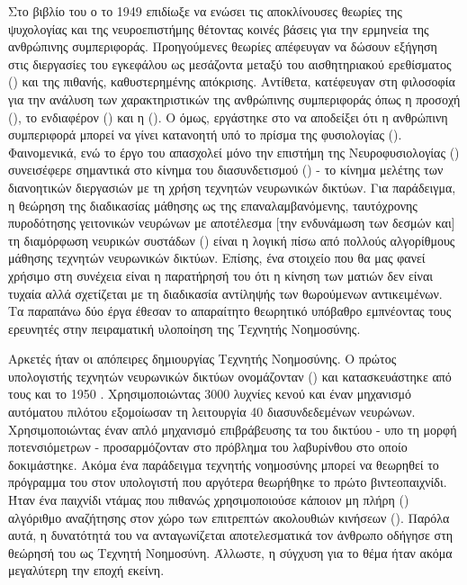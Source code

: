 Στο βιβλίο του \cite{hebb1949organization} ο  το 1949 επιδίωξε να ενώσει τις αποκλίνουσες θεωρίες της ψυχολογίας και της νευροεπιστήμης θέτοντας κοινές βάσεις για την ερμηνεία της ανθρώπινης συμπεριφοράς. Προηγούμενες θεωρίες απέφευγαν να δώσουν εξήγηση στις διεργασίες του εγκεφάλου ως μεσάζοντα μεταξύ του αισθητηριακού ερεθίσματος () και της πιθανής, καθυστερημένης απόκρισης. Αντίθετα, κατέφευγαν στη φιλοσοφία για την ανάλυση των χαρακτηριστικών της ανθρώπινης συμπεριφοράς όπως η προσοχή (), το ενδιαφέρον () και η  (). Ο  όμως, εργάστηκε στο να αποδείξει ότι η ανθρώπινη συμπεριφορά μπορεί να γίνει κατανοητή υπό το πρίσμα της φυσιολογίας (). Φαινομενικά, ενώ το έργο του απασχολεί μόνο την επιστήμη της Νευροφυσιολογίας () συνεισέφερε σημαντικά στο κίνημα του διασυνδετισμού () - το κίνημα μελέτης των διανοητικών διεργασιών με τη χρήση τεχνητών νευρωνικών δικτύων. Για παράδειγμα, η θεώρηση της διαδικασίας μάθησης ως της επαναλαμβανόμενης, ταυτόχρονης πυροδότησης γειτονικών νευρώνων με αποτέλεσμα [την ενδυνάμωση των δεσμών και] τη διαμόρφωση νευρικών συστάδων () είναι η λογική πίσω από πολλούς αλγορίθμους μάθησης τεχνητών νευρωνικών δικτύων. Επίσης, ένα στοιχείο που θα μας φανεί χρήσιμο στη συνέχεια είναι η παρατήρησή του ότι η κίνηση των ματιών δεν είναι τυχαία αλλά σχετίζεται με τη διαδικασία αντίληψής των θωρούμενων αντικειμένων. Τα παραπάνω δύο έργα έθεσαν το απαραίτητο θεωρητικό υπόβαθρο εμπνέοντας τους ερευνητές στην πειραματική υλοποίηση της Τεχνητής Νοημοσύνης.
\par

Αρκετές ήταν οι απόπειρες δημιουργίας Τεχνητής Νοημοσύνης. Ο πρώτος υπολογιστής τεχνητών νευρωνικών δικτύων ονομάζονταν  () και κατασκευάστηκε από τους  και  το 1950 \cite{akst_2019}. Χρησιμοποιώντας 3000 λυχνίες κενού και έναν μηχανισμό αυτόματου πιλότου εξομοίωσαν τη λειτουργία 40 διασυνδεδεμένων νευρώνων. Χρησιμοποιώντας έναν απλό μηχανισμό επιβράβευσης τα  του δικτύου - υπο τη μορφή ποτενσιόμετρων - προσαρμόζονταν  στο πρόβλημα του λαβυρίνθου στο οποίο δοκιμάστηκε. Ακόμα ένα παράδειγμα τεχνητής νοημοσύνης μπορεί να θεωρηθεί το πρόγραμμα του  στον υπολογιστή  \cite{lee1995computer} που αργότερα θεωρήθηκε το πρώτο βιντεοπαιχνίδι. Ήταν ένα παιχνίδι ντάμας που πιθανώς χρησιμοποιούσε κάποιον μη πλήρη () αλγόριθμο αναζήτησης στον χώρο των επιτρεπτών ακολουθιών κινήσεων (). Παρόλα αυτά, η δυνατότητά του να ανταγωνίζεται αποτελεσματικά τον άνθρωπο οδήγησε στη θεώρησή του ως Τεχνητή Νοημοσύνη. Άλλωστε, η σύγχυση για το θέμα ήταν ακόμα μεγαλύτερη την εποχή εκείνη. 
\par


